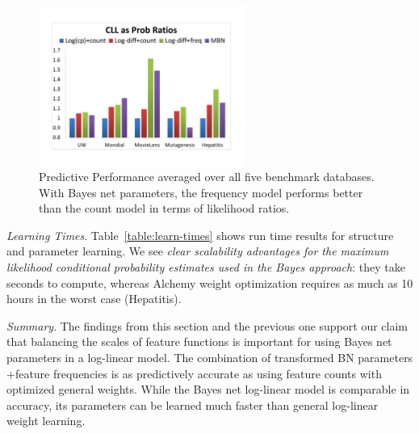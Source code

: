 \documentclass[twoside,11pt]{article}
\newcommand{\fixneeded}[1]{\textbf{[\footnotesize #1]}}
\newcommand{\point}[1]{\noindent\emph{#1}.}
\newcommand{\keypoint}[1]{{\em #1}}
\begin{document}
\begin{figure}[htbp]

\begin{center}
\includegraphics[width=0.6\textwidth]{CLL_Prob_Ratios_New}
\caption{Predictive Performance averaged over all five benchmark databases. With Bayes net parameters, the frequency model performs better than the count model in terms of likelihood ratios. 
}
\label{fig:summarize}
\end{center}
\end{figure}

\point{Learning Times}
Table~\ref{table:learn-times} shows run time results for structure and parameter learning. We see \keypoint{clear scalability advantages for the maximum likelihood conditional probability estimates used in the Bayes approach}: they take seconds to compute, whereas Alchemy weight optimization requires as much as 10 hours in the worst case (Hepatitis). 



\point{Summary} 
The findings from this section and the previous one support our claim that balancing the scales of feature functions is important for using Bayes net parameters in a log-linear model. The combination of  transformed BN parameters +feature frequencies  is as predictively accurate as using feature counts with optimized general weights.
While the Bayes net log-linear model is comparable in accuracy, its parameters can be learned much faster than general log-linear weight learning.
%

 
 
\end{document}
